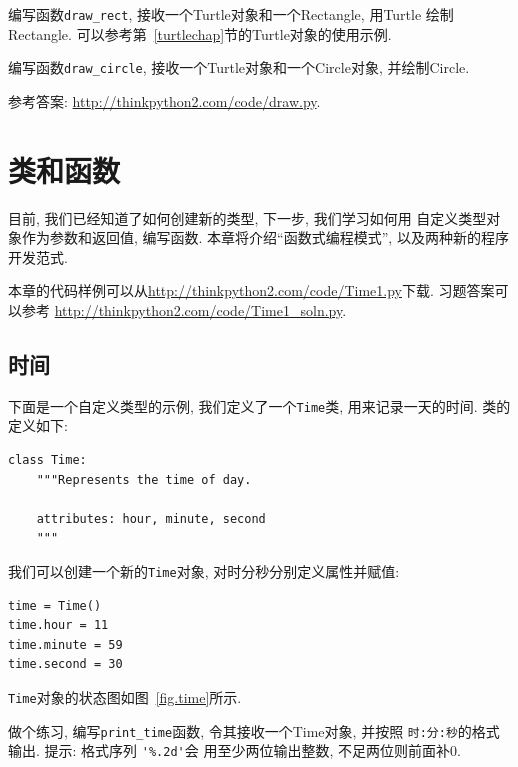 \documentclass[10pt]{book}
\begin{document}
\begin{exercise}

编写函数\verb"draw_rect", 接收一个Turtle对象和一个Rectangle, 
用Turtle 绘制Rectangle. 
可以参考第~\ref{turtlechap}节的Turtle对象的使用示例. 

编写函数\verb"draw_circle",  接收一个Turtle对象和一个Circle对象, 并绘制Circle.


参考答案: \url{http://thinkpython2.com/code/draw.py}.

\end{exercise}



\chapter{类和函数}
\label{time}

目前, 我们已经知道了如何创建新的类型, 下一步, 我们学习如何用
自定义类型对象作为参数和返回值, 编写函数. 
本章将介绍``函数式编程模式'', 以及两种新的程序开发范式. 


本章的代码样例可以从\url{http://thinkpython2.com/code/Time1.py}下载. 
习题答案可以参考
\url{http://thinkpython2.com/code/Time1_soln.py}.


\section{时间}
\label{isafter}

下面是一个自定义类型的示例, 我们定义了一个{\tt Time}类, 
用来记录一天的时间. 
类的定义如下: 
 

\begin{verbatim}
class Time:
    """Represents the time of day.
       
    attributes: hour, minute, second
    """
\end{verbatim}
%
我们可以创建一个新的{\tt Time}对象, 
对时分秒分别定义属性并赋值:

\begin{verbatim}
time = Time()
time.hour = 11
time.minute = 59
time.second = 30
\end{verbatim}
%
{\tt Time}对象的状态图如图~\ref{fig.time}所示.

做个练习, 编写\verb"print_time"函数, 令其接收一个Time对象, 并按照
{\tt 时:分:秒}的格式输出. 
提示: 格式序列 \verb"'%.2d'"会
用至少两位输出整数, 不足两位则前面补0. 
\end{document}
